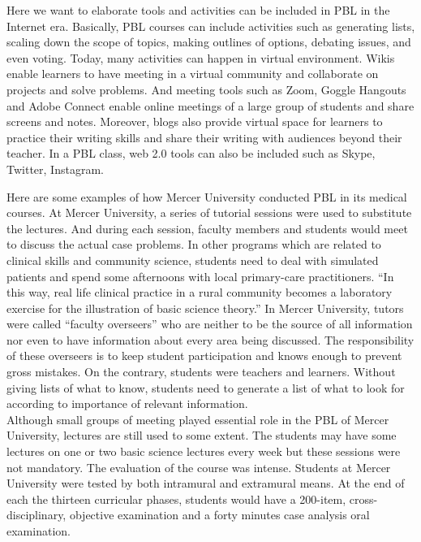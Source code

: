 \documentclass[sigconf]{acmart}
\begin{document}
 Here we want to elaborate tools and activities can be included in PBL in the Internet era. Basically,  PBL courses can include activities such as generating lists, scaling down the scope of topics, making outlines of options, debating issues, and even voting. Today, many activities can happen in virtual environment.  Wikis enable learners to have meeting in a virtual community and collaborate on projects and solve problems. And meeting tools such as Zoom, Goggle Hangouts and Adobe Connect enable online meetings of a large group of students and share screens and notes. Moreover, blogs also provide virtual space for learners to practice their writing skills and share their writing with audiences beyond their teacher. In a PBL class, web 2.0 tools can also be included such as Skype, Twitter, Instagram.


Here are some examples of how Mercer University conducted PBL in its medical courses.  At Mercer University, a series of tutorial sessions were used to substitute the lectures. And during each session, faculty members and students would meet to discuss the actual case problems. In other programs which are related to clinical skills and community science, students need to deal with simulated patients and spend some afternoons with local primary-care practitioners. ``In this way, real life clinical practice in a rural community becomes a laboratory exercise for the illustration of basic science theory.'' In Mercer University, tutors were called ``faculty overseers'' who are neither to be the source of all information nor even to have information about every area being discussed. The responsibility of these overseers is to keep student participation and knows enough to prevent gross mistakes. On the contrary, students were teachers and learners. Without giving lists of what to know, students need to generate a list of what to look for according to importance of relevant information.\\

Although small groups of meeting played essential role in the PBL of Mercer University, lectures are still used to some extent. The students may have some lectures on one or two basic science lectures every week but these sessions were not mandatory. The evaluation of the course was intense. Students at Mercer University were tested by both intramural and extramural means. At the end of each the thirteen curricular phases, students would have  a 200-item, cross-disciplinary, objective examination and a forty minutes case analysis oral examination.
\end{document}
